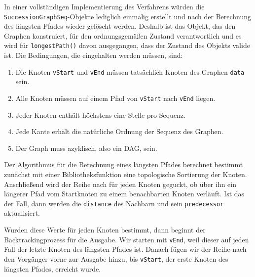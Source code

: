 In einer vollständigen Implementierung des Verfahrens würden die \texttt{SuccessionGraphSeq}-Objekte lediglich einmalig erstellt und nach der Berechnung des längsten Pfades wieder gelöscht werden. Deshalb ist das Objekt, das den Graphen konstruiert, für den ordnungsgemäßen Zustand verantwortlich und es wird für \texttt{longestPath()} davon ausgegangen, dass der Zustand des Objekts valide ist. Die Bedingungen, die eingehalten werden müssen, sind:

\begin{enumerate}[topsep=0pt,itemsep=-1ex,partopsep=1ex,parsep=1ex]
	\item Die Knoten \texttt{vStart} und \texttt{vEnd} müssen tatsächlich Knoten des Graphen \texttt{data} sein.
	\item Alle Knoten müssen auf einem Pfad von \texttt{vStart} nach \texttt{vEnd} liegen.
	\item Jeder Knoten enthält höchstens eine Stelle pro Sequenz.
	\item Jede Kante erhält die natürliche Ordnung der Sequenz des Graphen.
	\item Der Graph muss azyklisch, also ein DAG, sein.
\end{enumerate}

Der Algorithmus für die Berechnung eines längsten Pfades berechnet bestimmt zunächst mit einer Bibliotheksfunktion eine topologische Sortierung der Knoten. Anschließend wird der Reihe nach für jeden Knoten geguckt, ob über ihn ein längerer Pfad vom Startknoten zu einem benachbarten Knoten verläuft. Ist das der Fall, dann werden die \texttt{distance} des Nachbarn und sein \texttt{predecessor} aktualisiert. 

Wurden diese Werte für jeden Knoten bestimmt, dann beginnt der Backtrackingprozess für die Ausgabe. Wir starten mit \texttt{vEnd}, weil dieser auf jeden Fall der letzte Knoten des längsten Pfades ist. Danach fügen wir der Reihe nach den Vorgänger vorne zur Ausgabe hinzu, bis \texttt{vStart}, der erste Knoten des längsten Pfades, erreicht wurde.

